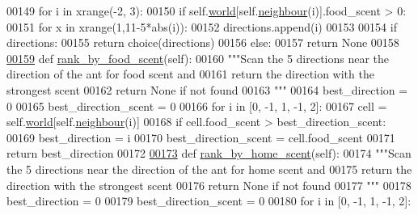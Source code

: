 \begin{DoxyCode}
00149             \textcolor{keywordflow}{for} i \textcolor{keywordflow}{in} xrange(-2, 3):
00150                 \textcolor{keywordflow}{if} self.\hyperlink{classants_1_1Ant_a55f64c7cafb3806bdcfda42586adbff5}{world}[self.\hyperlink{classants_1_1Ant_a2ddd97dadaa5d24c459b0117dc6e1190}{neighbour}(i)].food\_scent > 0:
00151                     \textcolor{keywordflow}{for} x \textcolor{keywordflow}{in} xrange(1,11-5*abs(i)):
00152                         directions.append(i) 
00153 
00154         \textcolor{keywordflow}{if} directions:
00155             \textcolor{keywordflow}{return} choice(directions)
00156         \textcolor{keywordflow}{else}:
00157             \textcolor{keywordflow}{return} \textcolor{keywordtype}{None}
00158 
\hypertarget{ants_8py_source_l00159}{}\hyperlink{classants_1_1Ant_a164a2a76f1779462fe81e8f169a92a93}{00159}     \textcolor{keyword}{def }\hyperlink{classants_1_1Ant_a164a2a76f1779462fe81e8f169a92a93}{rank\_by\_food\_scent}(self):
00160         \textcolor{stringliteral}{"""Scan the 5 directions near the direction of the ant for food scent and}
00161 \textcolor{stringliteral}{        return the direction with the strongest scent}
00162 \textcolor{stringliteral}{        return None if not found}
00163 \textcolor{stringliteral}{        """}
00164         best\_direction = 0
00165         best\_direction\_scent = 0
00166         \textcolor{keywordflow}{for} i \textcolor{keywordflow}{in} [0, -1, 1, -1, 2]:
00167             cell = self.\hyperlink{classants_1_1Ant_a55f64c7cafb3806bdcfda42586adbff5}{world}[self.\hyperlink{classants_1_1Ant_a2ddd97dadaa5d24c459b0117dc6e1190}{neighbour}(i)]
00168             \textcolor{keywordflow}{if} cell.food\_scent > best\_direction\_scent:
00169                 best\_direction = i
00170                 best\_direction\_scent = cell.food\_scent
00171         \textcolor{keywordflow}{return} best\_direction
00172 
\hypertarget{ants_8py_source_l00173}{}\hyperlink{classants_1_1Ant_a6f3e3bd98a5f382098cdc1c02e1e2fd0}{00173}     \textcolor{keyword}{def }\hyperlink{classants_1_1Ant_a6f3e3bd98a5f382098cdc1c02e1e2fd0}{rank\_by\_home\_scent}(self):
00174         \textcolor{stringliteral}{"""Scan the 5 directions near the direction of the ant for home scent and}
00175 \textcolor{stringliteral}{        return the direction with the strongest scent}
00176 \textcolor{stringliteral}{        return None if not found}
00177 \textcolor{stringliteral}{        """}
00178         best\_direction = 0
00179         best\_direction\_scent = 0
00180         \textcolor{keywordflow}{for} i \textcolor{keywordflow}{in} [0, -1, 1, -1, 2]:

\end{DoxyCode}
